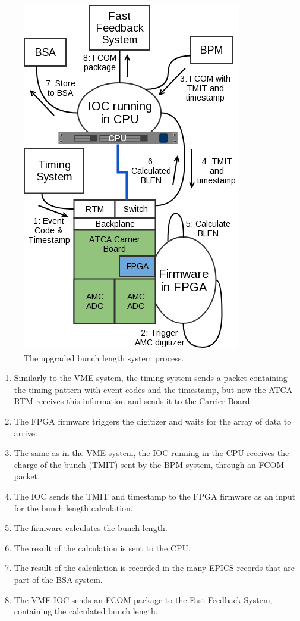 \documentclass[letter,
        biblatex,   %
        keeplastbox,  %
        ]{jacow}
\begin{document}
\begin{figure}[!htb]
  \centering
  \includegraphics*[width=.8\columnwidth]{BLEN_ATCA_Process}
  \caption{The upgraded bunch length system process.}
  \label{fig:blen_atca}
\end{figure}

\begin{enumerate}
  \item Similarly to the VME system, the timing system sends a packet containing the timing pattern with event codes and the timestamp, but now the ATCA RTM receives this information and sends it to the Carrier Board.
  \item The FPGA firmware triggers the digitizer and waits for the array of data to arrive.
  \item The same as in the VME system, the IOC running in the CPU receives the charge of the bunch (TMIT) sent by the BPM system, through an FCOM packet.
  \item The IOC sends the TMIT and timestamp to the FPGA firmware as an input for the bunch length calculation.
  \item The firmware calculates the bunch length.
  \item The result of the calculation is sent to the CPU.
  \item The result of the calculation is recorded in the many EPICS records that are part of the BSA system.
  \item The VME IOC sends an FCOM package to the Fast Feedback System, containing the calculated bunch length.
\end{enumerate}
\end{document}
